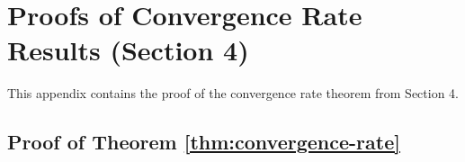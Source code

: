 
\section{Proofs of Convergence Rate Results (Section 4)}

This appendix contains the proof of the convergence rate theorem from Section 4.

\subsection{Proof of Theorem \ref{thm:convergence-rate}}

